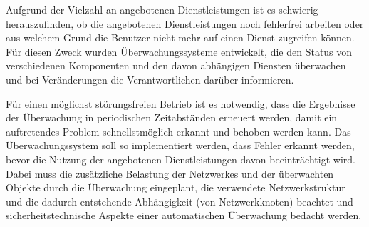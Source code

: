 

Aufgrund der Vielzahl an angebotenen Dienstleistungen ist es schwierig herauszufinden, ob die angebotenen Dienstleistungen noch fehlerfrei arbeiten oder aus welchem Grund die Benutzer nicht mehr auf einen Dienst zugreifen können.
Für diesen Zweck wurden Überwachungssysteme entwickelt, die den Status von verschiedenen Komponenten und den davon abhängigen Diensten überwachen und bei Veränderungen die Verantwortlichen darüber informieren.

Für einen möglichst störungsfreien Betrieb ist es notwendig, dass die Ergebnisse der Überwachung in periodischen Zeitabständen erneuert werden, damit ein auftretendes Problem schnellstmöglich erkannt und behoben werden kann.
Das Überwachungssystem soll so implementiert werden, dass Fehler erkannt werden, bevor die Nutzung der angebotenen Dienstleistungen davon beeinträchtigt wird.
Dabei muss die zusätzliche Belastung der Netzwerkes und der überwachten Objekte durch die Überwachung eingeplant, die verwendete Netzwerkstruktur und die dadurch entstehende Abhängigkeit (von Netzwerkknoten) beachtet und sicherheitstechnische Aspekte einer automatischen Überwachung bedacht werden.\\


